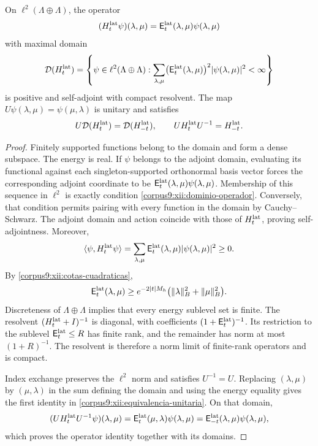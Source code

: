 \begin{theorem}
\label{corpus9:xii:operador-positivo}
On \(\ell^2(\Lambda\oplus\Lambda)\), the operator
\[
 (H_t^{\rm lat}\psi)(\lambda,\mu)
 =\mathsf E_t^{\rm lat}(\lambda,\mu)\psi(\lambda,\mu)
\]
with maximal domain
\begin{equation}
 \mathcal D(H_t^{\rm lat})=
 \left\{\psi\in\ell^2(\Lambda\oplus\Lambda):
 \sum_{\lambda,\mu}\bigl(\mathsf E_t^{\rm lat}(\lambda,\mu)\bigr)^2
                  |\psi(\lambda,\mu)|^2<\infty\right\}
 \label{corpus9:xii:dominio-operador}
\end{equation}
is positive and self-adjoint with compact resolvent. The map
\(U\psi(\lambda,\mu)=\psi(\mu,\lambda)\) is unitary and satisfies
\begin{equation}
 U\mathcal D(H_t^{\rm lat})=\mathcal D(H_{-t}^{\rm lat}),\qquad
 UH_t^{\rm lat}U^{-1}=H_{-t}^{\rm lat}.
 \label{corpus9:xii:equivalencia-unitaria}
\end{equation}
\end{theorem}
\begin{proof}
Finitely supported functions belong to the domain and form a dense
subspace. The energy is real. If \(\psi\) belongs to the adjoint
domain, evaluating its functional against each singleton-supported
orthonormal basis vector forces the corresponding adjoint coordinate
to be \(\mathsf E_t^{\rm lat}(\lambda,\mu)\psi(\lambda,\mu)\).
Membership of this sequence in \(\ell^2\) is exactly condition
\eqref{corpus9:xii:dominio-operador}. Conversely, that condition permits
pairing with every function in the domain by Cauchy--Schwarz. The
adjoint domain and action coincide with those of \(H_t^{\rm lat}\),
proving self-adjointness. Moreover,
\[
 \langle\psi,H_t^{\rm lat}\psi\rangle
 =\sum_{\lambda,\mu}\mathsf E_t^{\rm lat}(\lambda,\mu)
                         |\psi(\lambda,\mu)|^2\geq0.
\]
By \eqref{corpus9:xii:cotas-cuadraticas},
\[
 \mathsf E_t^{\rm lat}(\lambda,\mu)
 \geq e^{-2|t|M_h}
       \bigl(\|\lambda\|_B^2+\|\mu\|_B^2\bigr).
\]
Discreteness of \(\Lambda\oplus\Lambda\) implies that every energy
sublevel set is finite. The resolvent \((H_t^{\rm lat}+I)^{-1}\)
is diagonal, with coefficients \((1+\mathsf E_t^{\rm lat})^{-1}\).
Its restriction to the sublevel \(\mathsf E_t^{\rm lat}\leq R\)
has finite rank, and the remainder has norm at most \((1+R)^{-1}\).
The resolvent is therefore a norm limit of finite-rank operators and
is compact.

Index exchange preserves the \(\ell^2\) norm and satisfies
\(U^{-1}=U\). Replacing \((\lambda,\mu)\) by \((\mu,\lambda)\)
in the sum defining the domain and using the energy equality gives
the first identity in \eqref{corpus9:xii:equivalencia-unitaria}.
On that domain,
\[
 (UH_t^{\rm lat}U^{-1}\psi)(\lambda,\mu)
 =\mathsf E_t^{\rm lat}(\mu,\lambda)\psi(\lambda,\mu)
 =\mathsf E_{-t}^{\rm lat}(\lambda,\mu)\psi(\lambda,\mu),
\]
which proves the operator identity together with its domains.
\end{proof}

